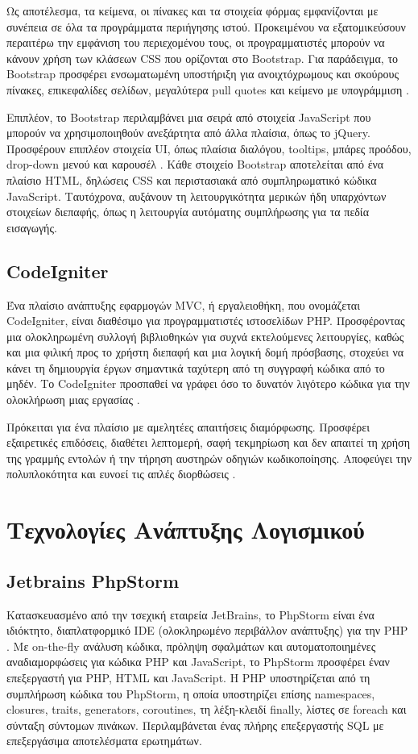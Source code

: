 Ως αποτέλεσμα, τα κείμενα, οι πίνακες και τα στοιχεία φόρμας εμφανίζονται με συνέπεια σε όλα τα προγράμματα περιήγησης ιστού. Προκειμένου να εξατομικεύσουν περαιτέρω την εμφάνιση του περιεχομένου τους, οι προγραμματιστές μπορούν να κάνουν χρήση των κλάσεων CSS που ορίζονται στο Bootstrap. Για παράδειγμα, το Bootstrap προσφέρει ενσωματωμένη υποστήριξη για ανοιχτόχρωμους και σκούρους πίνακες, επικεφαλίδες σελίδων, μεγαλύτερα pull quotes και κείμενο με υπογράμμιση \cite{bootstrap_2}.

Επιπλέον, το Bootstrap περιλαμβάνει μια σειρά από στοιχεία JavaScript που μπορούν να χρησιμοποιηθούν ανεξάρτητα από άλλα πλαίσια, όπως το jQuery. Προσφέρουν επιπλέον στοιχεία UI, όπως πλαίσια διαλόγου, tooltips, μπάρες προόδου, drop-down μενού και καρουσέλ \cite{gaikwad2019review}. Κάθε στοιχείο Bootstrap αποτελείται από ένα πλαίσιο HTML, δηλώσεις CSS και περιστασιακά από συμπληρωματικό κώδικα JavaScript. Ταυτόχρονα, αυξάνουν τη λειτουργικότητα μερικών ήδη υπαρχόντων στοιχείων διεπαφής, όπως η λειτουργία αυτόματης συμπλήρωσης για τα πεδία εισαγωγής.

\subsection{CodeIgniter}
Ένα πλαίσιο ανάπτυξης εφαρμογών MVC, ή εργαλειοθήκη, που ονομάζεται CodeIgniter, είναι διαθέσιμο για προγραμματιστές ιστοσελίδων PHP. Προσφέροντας μια ολοκληρωμένη συλλογή βιβλιοθηκών για συχνά εκτελούμενες λειτουργίες, καθώς και μια φιλική προς το χρήστη διεπαφή και μια λογική δομή πρόσβασης, στοχεύει να κάνει τη δημιουργία έργων σημαντικά ταχύτερη από τη συγγραφή κώδικα από το μηδέν. Το CodeIgniter προσπαθεί να γράφει όσο το δυνατόν λιγότερο κώδικα για την ολοκλήρωση μιας εργασίας \cite{Jackson_2020}.

Πρόκειται για ένα πλαίσιο με αμελητέες απαιτήσεις διαμόρφωσης. Προσφέρει εξαιρετικές επιδόσεις, διαθέτει λεπτομερή, σαφή τεκμηρίωση και δεν απαιτεί τη χρήση της γραμμής εντολών ή την τήρηση αυστηρών οδηγιών κωδικοποίησης. Αποφεύγει την πολυπλοκότητα και ευνοεί τις απλές διορθώσεις \cite{CodeIgniter_2022}.

\section{Τεχνολογίες Ανάπτυξης Λογισμικού}

\subsection{Jetbrains PhpStorm}
Κατασκευασμένο από την τσεχική εταιρεία JetBrains, το PhpStorm είναι ένα ιδιόκτητο, διαπλατφορμικό IDE (ολοκληρωμένο περιβάλλον ανάπτυξης) για την PHP \cite{grigorev2014string}. Με on-the-fly ανάλυση κώδικα, πρόληψη σφαλμάτων και αυτοματοποιημένες αναδιαμορφώσεις για κώδικα PHP και JavaScript, το PhpStorm προσφέρει έναν επεξεργαστή για PHP, HTML και JavaScript. Η PHP υποστηρίζεται από τη συμπλήρωση κώδικα του PhpStorm, η οποία υποστηρίζει επίσης namespaces, closures, traits, generators, coroutines, τη λέξη-κλειδί finally, λίστες σε foreach και σύνταξη σύντομων πινάκων. Περιλαμβάνεται ένας πλήρης επεξεργαστής SQL με επεξεργάσιμα αποτελέσματα ερωτημάτων.

